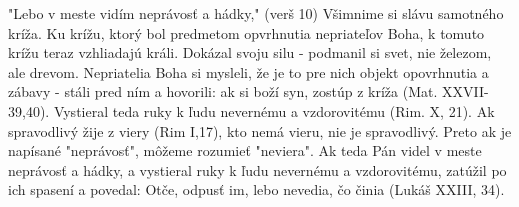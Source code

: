 "Lebo v meste vidím neprávosť a hádky," (verš 10)
Všimnime si slávu samotného kríža.
Ku krížu, ktorý bol predmetom opvrhnutia nepriateľov Boha, k tomuto krížu teraz vzhliadajú králi. Dokázal svoju silu - podmanil si svet, nie železom, ale drevom. Nepriatelia Boha si mysleli, že je to pre nich objekt opovrhnutia a zábavy - stáli pred ním a hovorili: ak si boží syn, zostúp z kríža (Mat. XXVII-39,40). Vystieral teda ruky k ľudu nevernému a vzdorovitému (Rim. X, 21). Ak spravodlivý žije z viery (Rim I,17), kto nemá vieru, nie je spravodlivý. Preto ak je napísané "neprávosť", môžeme rozumieť "neviera". Ak teda Pán videl v meste neprávosť a hádky, a vystieral ruky k ľudu nevernému a vzdorovitému, zatúžil po ich spasení a povedal: Otče, odpusť im, lebo nevedia, čo činia (Lukáš XXIII, 34). 